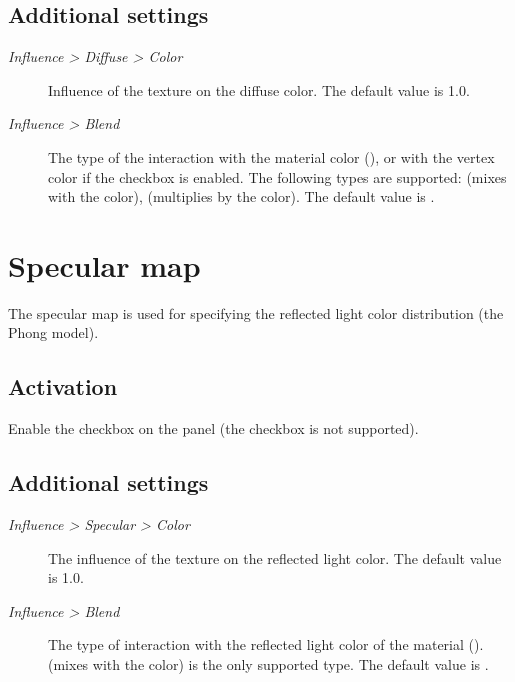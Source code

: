 \documentclass[a4paper,12pt,oneside]{sphinxmanual}
\begin{document}
\subsection{Additional settings}
\label{textures:id5}\begin{description}
\item[{\emph{Influence \textgreater{} Diffuse \textgreater{} Color}}] \leavevmode
Influence of the texture on the diffuse color. The default value is 1.0.

\item[{\emph{Influence \textgreater{} Blend}}] \leavevmode
The type of the interaction with the material color (), or with the vertex color if the  checkbox is enabled. The following types are supported:  (mixes with the color),  (multiplies by the color). The default value is .

\end{description}


\section{Specular map}
\label{textures:index-5}\label{textures:specular-map}
The specular map is used for specifying the reflected light color distribution (the Phong model).


\subsection{Activation}
\label{textures:id6}
Enable the  checkbox on the  panel (the  checkbox is not supported).


\subsection{Additional settings}
\label{textures:id7}\begin{description}
\item[{\emph{Influence \textgreater{} Specular \textgreater{} Color}}] \leavevmode
The influence of the texture on the reflected light color. The default value is 1.0.

\item[{\emph{Influence \textgreater{} Blend}}] \leavevmode
The type of interaction with the reflected light color of the material ().  (mixes with the color) is the only supported type. The default value is .

\end{description}
\end{document}
